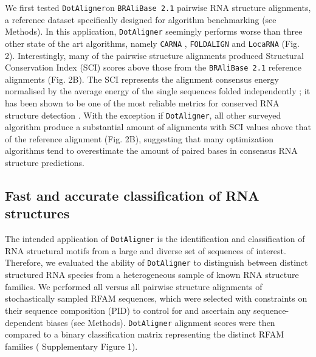 \documentclass{bmcart}
\newcommand\dotaligner{\texttt{DotAligner}}
\newcommand\bralibase{\texttt{BRAliBase 2.1}}
\newcommand\locarna{\texttt{LocaRNA}}
\newcommand\foldalign{\texttt{FOLDALIGN}}
\newcommand\carna{\texttt{CARNA}}
\begin{document}
We first tested \dotaligner on \bralibase{} pairwise RNA structure alignments, a reference 
dataset specifically designed for algorithm benchmarking 
\cite{Gardner15860779,wilm2006enhanced} (see Methods). In this application, \dotaligner{} seemingly  
performs worse than three other state of the art algorithms, namely \carna{} \cite{Sorescu2012}, \foldalign{} \cite{havgaard2007fast,sundfeld2015foldalign} and \locarna{} \cite{Will17432929}
(Fig. 2). Interestingly, many of the pairwise structure alignments produced Structural 
Conservation Index (SCI) scores above those from the \bralibase{} reference alignments 
(Fig. 2B). The SCI represents the alignment consensus energy normalised
 by the average energy of the single sequences folded independently \cite{washietl2005fast}; 
it has been shown to be one of the most reliable metrics for conserved RNA structure 
detection \cite{gruber2008strategies}. With the exception if \dotaligner{}, all other 
surveyed algorithm produce a substantial amount of alignments with SCI values 
above that of the reference  alignment (Fig. 2B), suggesting that many optimization 
algorithms tend to overestimate the amount of paired bases in consensus RNA structure predictions. \\

\subsection*{Fast and accurate classification of RNA structures} 

The intended application of \dotaligner{}  is the identification and
classification of RNA structural motifs from a large and diverse set of sequences of interest. 
Therefore, we evaluated the ability of \dotaligner{} to distinguish between distinct structured 
RNA species from a heterogeneous sample of known RNA structure families. 
We performed all versus all pairwise structure alignments of stochastically sampled RFAM sequences, 
which were selected with constraints on their sequence composition (PID) to 
control for and ascertain any sequence-dependent biases (see Methods). 
\dotaligner{} alignment scores were then compared to a binary classification matrix 
representing the distinct RFAM families ( Supplementary Figure 1).\\
\end{document}

